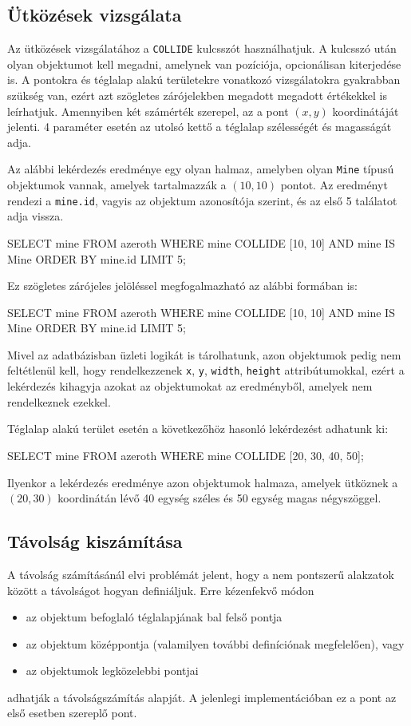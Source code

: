 \subsection{Ütközések vizsgálata}

Az ütközések vizsgálatához a \texttt{COLLIDE} kulcsszót használhatjuk. A kulcsszó után olyan objektumot kell megadni, amelynek van pozíciója, opcionálisan kiterjedése is. A pontokra és téglalap alakú területekre vonatkozó vizsgálatokra gyakrabban szükség van, ezért azt szögletes zárójelekben megadott megadott értékekkel is leírhatjuk. Amennyiben két számérték szerepel, az a pont $(x, y)$ koordinátáját jelenti. 4 paraméter esetén az utolsó kettő a téglalap szélességét és magasságát adja.

Az alábbi lekérdezés eredménye egy olyan halmaz, amelyben olyan \texttt{Mine} típusú objektumok vannak, amelyek tartalmazzák a $(10, 10)$ pontot. Az eredményt rendezi a \texttt{mine.id}, vagyis az objektum azonosítója szerint, és az első 5 találatot adja vissza.
\begin{sql}
SELECT mine
FROM azeroth
WHERE mine COLLIDE [10, 10] AND mine IS Mine
ORDER BY mine.id
LIMIT 5;
\end{sql}
Ez szögletes zárójeles jelöléssel megfogalmazható az alábbi formában is:
\begin{sql}
SELECT mine
FROM azeroth
WHERE mine COLLIDE [10, 10] AND mine IS Mine
ORDER BY mine.id
LIMIT 5;
\end{sql}
Mivel az adatbázisban üzleti logikát is tárolhatunk, azon objektumok pedig nem feltétlenül kell, hogy rendelkezzenek \texttt{x}, \texttt{y}, \texttt{width}, \texttt{height} attribútumokkal, ezért a lekérdezés kihagyja azokat az objektumokat az eredményből, amelyek nem rendelkeznek ezekkel.

Téglalap alakú terület esetén a következőhöz hasonló lekérdezést adhatunk ki:
\begin{sql}
SELECT mine
FROM azeroth
WHERE mine COLLIDE [20, 30, 40, 50];
\end{sql}
Ilyenkor a lekérdezés eredménye azon objektumok halmaza, amelyek ütköznek a $(20, 30)$ koordinátán lévő 40 egység széles és 50 egység magas négyszöggel.

\subsection{Távolság kiszámítása}

A távolság számításánál elvi problémát jelent, hogy a nem pontszerű alakzatok között a távolságot hogyan definiáljuk. Erre kézenfekvő módon
\begin{itemize}
\item az objektum befoglaló téglalapjának bal felső pontja
\item az objektum középpontja (valamilyen további definíciónak megfelelően), vagy
\item az objektumok legközelebbi pontjai
\end{itemize}
adhatják a távolságszámítás alapját. A jelenlegi implementációban ez a pont az első esetben szereplő pont.

